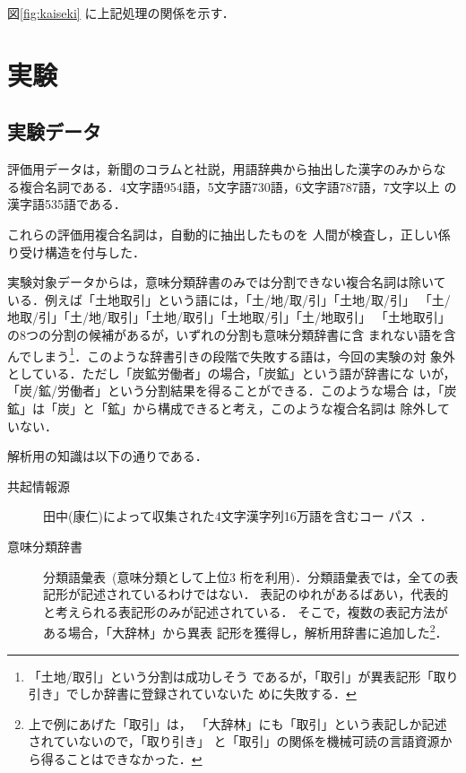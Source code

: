 図\ref{fig:kaiseki} に上記処理の関係を示す．


\section{実験}
\label{sec:rsl}
\subsection{実験データ}
\label{sec:data-analy}

評価用データは，新聞のコラムと社説，用語辞典から抽出した漢字のみからな
る複合名詞である．4文字語954語，5文字語730語，6文字語787語，7文字以上
の漢字語535語である．
\newpage
\begin{center}
\end{center}
これらの評価用複合名詞は，自動的に抽出したものを
人間が検査し，正しい係り受け構造を付与した．

実験対象データからは，意味分類辞書のみでは分割できない複合名詞は除いて
いる．例えば「土地取引」という語には，「土/地/取/引」「土地/取/引」
「土/地取/引」「土/地/取引」「土地/取引」「土地取/引」「土/地取引」
「土地取引」の8つの分割の候補があるが，いずれの分割も意味分類辞書に含
まれない語を含んでしまう\footnote{「土地/取引」という分割は成功しそう
であるが，「取引」が異表記形「取り引き」でしか辞書に登録されていないた
めに失敗する．}．このような辞書引きの段階で失敗する語は，今回の実験の対
象外としている．ただし「炭鉱労働者」の場合，「炭鉱」という語が辞書にな
いが，「炭/鉱/労働者」という分割結果を得ることができる．このような場合
は，「炭鉱」は「炭」と「鉱」から構成できると考え，このような複合名詞は
除外していない．

解析用の知識は以下の通りである．
\begin{description}
\item[共起情報源] 田中(康仁)によって収集された4文字漢字列16万語を含むコー
パス~\cite{tanaka:92:g}．
\item[意味分類辞書] 分類語彙表~\cite{hayashi:66:a}(意味分類として上位3 
桁を利用)．分類語彙表では，全ての表記形が記述されているわけではない． 
表記のゆれがあるばあい，代表的と考えられる表記形のみが記述されている．
そこで，複数の表記方法がある場合，「大辞林」\cite{daizirin:88}から異表 
記形を獲得し，解析用辞書に追加した\footnote{上で例にあげた「取引」は，
「大辞林」にも「取引」という表記しか記述されていないので，「取り引き」
と「取引」の関係を機械可読の言語資源から得ることはできなかった．}．
\end{description}

